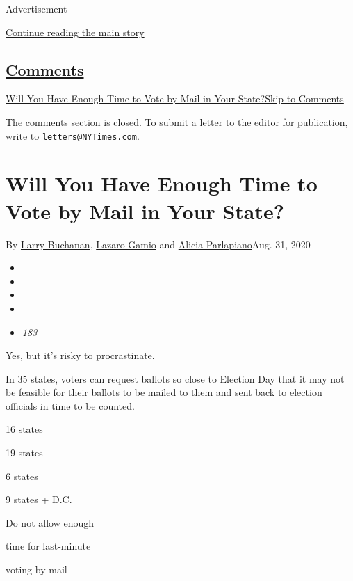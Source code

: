 Advertisement

\protect\hyperlink{after-top}{Continue reading the main story}

\hypertarget{comments}{%
\subsection{\texorpdfstring{\protect\hyperlink{commentsContainer}{Comments}}{Comments}}\label{comments}}

\href{}{Will You Have Enough Time to Vote by Mail in Your
State?}\href{}{Skip to Comments}

The comments section is closed. To submit a letter to the editor for
publication, write to
\href{mailto:letters@NYTimes.com}{\nolinkurl{letters@NYTimes.com}}.

\hypertarget{will-you-have-enough-time-to-vote-by-mail-in-your-state}{%
\section{Will You Have Enough Time to Vote by Mail in Your
State?}\label{will-you-have-enough-time-to-vote-by-mail-in-your-state}}

By \href{https://www.nytimes3xbfgragh.onion/by/larry-buchanan}{Larry
Buchanan},
\href{https://www.nytimes3xbfgragh.onion/by/lazaro-gamio}{Lazaro Gamio}
and
\href{https://www.nytimes3xbfgragh.onion/by/alicia-parlapiano}{Alicia
Parlapiano}Aug. 31, 2020

\begin{itemize}
\item
\item
\item
\item
\item
  \emph{183}
\end{itemize}

Yes, but it's risky to procrastinate.

In 35 states, voters can request ballots so close to Election Day that
it may not be feasible for their ballots to be mailed to them and sent
back to election officials in time to be counted.

16 states

19 states

6 states

9 states + D.C.

Do not allow enough

time for last-minute

voting by mail

